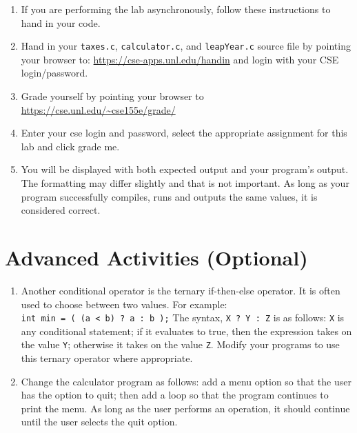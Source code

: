 \documentclass[12pt]{scrartcl}
\begin{document}
\begin{enumerate}
  \item If you are performing the lab asynchronously, follow these instructions to hand in your code.
  \item Hand in your \texttt{taxes.c}, \texttt{calculator.c}, and \texttt{leapYear.c} source file by pointing your browser to:
  	\url{https://cse-apps.unl.edu/handin} and login with your CSE
	login/password.
  \item Grade yourself by pointing your browser to
  	\url{https://cse.unl.edu/~cse155e/grade/}
  \item Enter your cse login and password, select the appropriate assignment for
  	this lab and click grade me.
  \item You will be displayed with both expected output and your program's output.
	The formatting may differ slightly and that is not important.  As long as your
	program successfully compiles, runs and outputs the same values, it is considered
	correct.
\end{enumerate}


\section{Advanced Activities (Optional)}

\begin{enumerate}
  \item Another conditional operator is the ternary if-then-else operator.  
  	It is often used to choose between two values.  For example:\\	
	\texttt{int min = ( (a < b) ? a : b );}
	The syntax, \texttt{X ? Y : Z} is as follows: \texttt{X} 
	is any conditional statement; if it evaluates to true, then the 
	expression takes on the value \texttt{Y}; otherwise it takes 
	on the value \texttt{Z}.  Modify your programs to use this 
	ternary operator where appropriate.
  \item Change the calculator program as follows: add a menu option 
	so that the user has the option to quit; then add a loop so that 
	the program continues to print the menu.  As long as the user 
	performs an operation, it should continue until the user selects 
	the quit option.
\end{enumerate}
\end{document}
